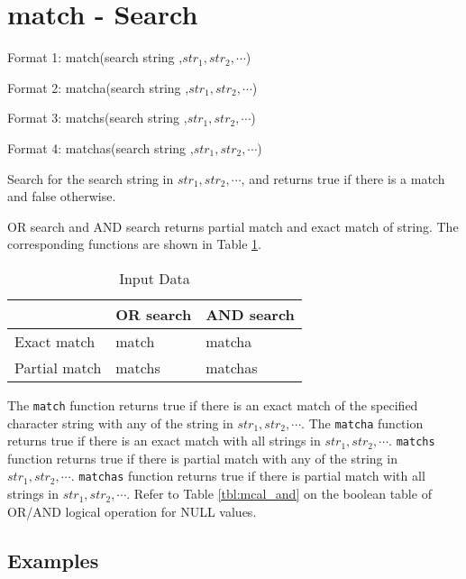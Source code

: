 
%

\section{match - Search\label{sect:match}}

Format 1: match(search string ,$str_1,str_2,\cdots$)

Format 2: matcha(search string ,$str_1,str_2,\cdots$)

Format 3: matchs(search string ,$str_1,str_2,\cdots$)

Format 4: matchas(search string ,$str_1,str_2,\cdots$)

Search for the search string in $str_1,str_2,\cdots$, and returns true if there is a match and false otherwise.

OR search and AND search returns partial match and exact match of string. The corresponding functions are shown in Table \ref{tbl:func_match_cond}. 



\begin{table}[htbp]
\begin{center}
\caption{Input Data\label{tbl:func_match_cond}}
{\small
\begin{tabular}{l|ll}
\hline
& OR search & AND search \\
\hline
Exact match & match  & matcha  \\
Partial match & matchs & matchas \\
\hline
\end{tabular}
}
\end{center}
\end{table}

The \verb|match| function returns true if there is an exact match of the specified character string with any of the string in $str_1,str_2,\cdots$. 
The \verb|matcha| function returns true if there is an exact match with all strings in  $str_1,str_2,\cdots$. 
\verb|matchs| function returns true if there is partial match with any of the string in $str_1,str_2,\cdots$.  
\verb|matchas| function returns true if there is partial match with all strings in $str_1,str_2,\cdots$.  
Refer to Table \ref{tbl:mcal_and} on the boolean table of OR/AND logical operation for NULL values. 


\subsection*{Examples}


%


